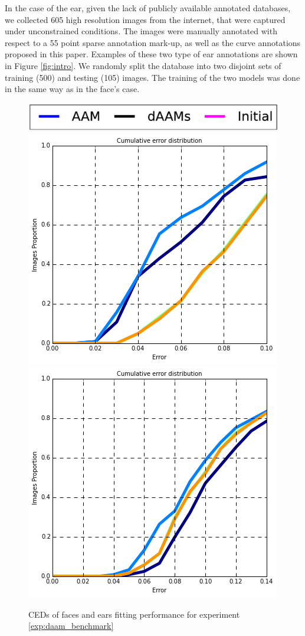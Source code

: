 In the case of the ear, given the lack of publicly available annotated databases, we collected 605 high resolution images from the internet, that were captured under unconstrained conditions. The images were manually annotated with respect to a 55 point sparse annotation mark-up, as well as the curve annotations proposed in this paper. Examples of these two type of ear annotations are shown in Figure \ref{fig:intro}. We randomly split the database into two disjoint sets of training (500) and testing (105) images. The training of the two models was done in the same way as in the face's case.

\begin{figure}[b!]
    \centering
    \includegraphics[width=0.6\columnwidth]{resources/DAAMBenchmark/legend}
    \\
    \includegraphics[width=0.48\columnwidth]{resources/DAAMBenchmark/face}
    \includegraphics[width=0.48\columnwidth]{resources/DAAMBenchmark/ear}
    \caption{CEDs of faces and ears fitting performance for experiment \ref{exp:daam_benchmark}}
    \label{fig:daam_benchmark}
\end{figure}


